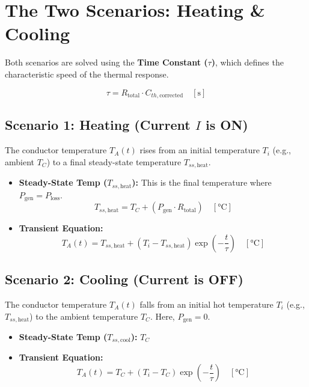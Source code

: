 \documentclass[11pt, a4paper]{article}
\begin{document}
\section{The Two Scenarios: Heating \& Cooling}

Both scenarios are solved using the \textbf{Time Constant ($\tau$)}, which defines the characteristic speed of the thermal response.

\begin{equation}
    \tau = R_{\text{total}} \cdot C_{th,\text{corrected}} \quad [\si{\second}]
\end{equation}

\subsection{Scenario 1: Heating (Current $I$ is ON)}
The conductor temperature $T_A(t)$ rises from an initial temperature $T_i$ (e.g., ambient $T_C$) to a final steady-state temperature $T_{ss,\text{heat}}$.

\begin{itemize}
    \item \textbf{Steady-State Temp ($T_{ss,\text{heat}}$):} This is the final temperature where $P_{\text{gen}} = P_{\text{loss}}$.
    \begin{equation}
        T_{ss,\text{heat}} = T_C + (P_{\text{gen}} \cdot R_{\text{total}}) \quad [\si{\celsius}]
    \end{equation}
    
    \item \textbf{Transient Equation:}
    \begin{equation}
        T_A(t) = T_{ss,\text{heat}} + (T_i - T_{ss,\text{heat}}) \exp\left(-\frac{t}{\tau}\right) \quad [\si{\celsius}]
    \end{equation}
\end{itemize}

\subsection{Scenario 2: Cooling (Current is OFF)}
The conductor temperature $T_A(t)$ falls from an initial hot temperature $T_i$ (e.g., $T_{ss,\text{heat}}$) to the ambient temperature $T_C$. Here, $P_{\text{gen}} = 0$.

\begin{itemize}
    \item \textbf{Steady-State Temp ($T_{ss,\text{cool}}$):} $T_C$
    
    \item \textbf{Transient Equation:}
    \begin{equation}
        T_A(t) = T_C + (T_i - T_C) \exp\left(-\frac{t}{\tau}\right) \quad [\si{\celsius}]
    \end{equation}
\end{itemize}
\end{document}
